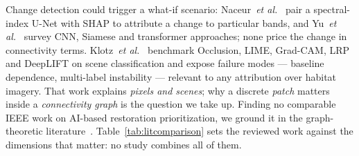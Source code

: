 \documentclass[conference]{IEEEtran}
\begin{document}
Change detection could trigger a what-if scenario: Naceur~\emph{et al.}~\cite{naceur2025unet} pair a spectral-index U-Net with SHAP to attribute a change to particular bands, and Yu~\emph{et al.}~\cite{yu2025changedetection} survey CNN, Siamese and transformer approaches; none price the change in connectivity terms. Klotz~\emph{et al.}~\cite{klotz2025xai} benchmark Occlusion, LIME, Grad-CAM, LRP and DeepLIFT on scene classification and expose failure modes --- baseline dependence, multi-label instability --- relevant to any attribution over habitat imagery. That work explains \emph{pixels and scenes}; why a discrete \emph{patch} matters inside a \emph{connectivity graph} is the question we take up. Finding no comparable IEEE work on AI-based restoration prioritization, we ground it in the graph-theoretic literature~\cite{urban2001landscape,pascualhortal2006comparison,saura2007habitat}. Table~\ref{tab:litcomparison} sets the reviewed work against the dimensions that matter: no study combines all of them.
\end{document}
